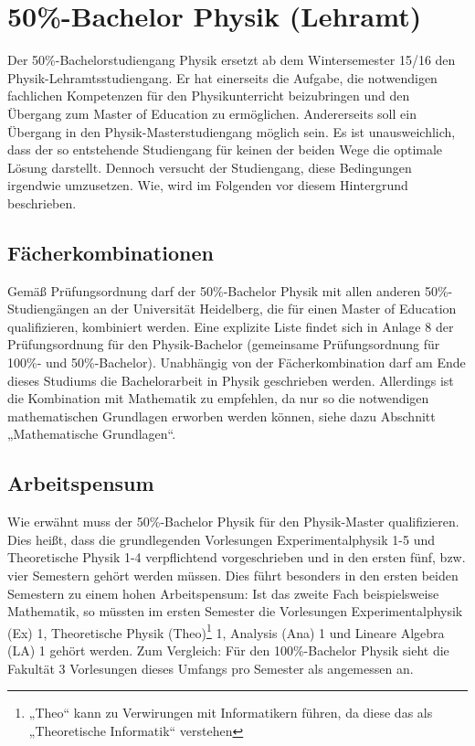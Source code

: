 \section{50\%-Bachelor Physik (Lehramt)} %

Der 50\%-Bachelorstudiengang Physik ersetzt ab dem Wintersemester 15/16 den Physik-Lehramtsstudiengang. Er hat einerseits die Aufgabe, die notwendigen fachlichen Kompetenzen für den Physikunterricht beizubringen und den Übergang zum Master of Education zu ermöglichen. Andererseits soll ein Übergang in den Physik-Masterstudiengang möglich sein. Es ist unausweichlich, dass der so entstehende Studiengang für keinen der beiden Wege die optimale Lösung darstellt. Dennoch versucht der Studiengang, diese Bedingungen irgendwie umzusetzen. Wie, wird im Folgenden vor diesem Hintergrund beschrieben.

\subsection{Fächerkombinationen}

Gemäß Prüfungsordnung darf der 50\%-Bachelor Physik mit allen anderen 50\%-Studiengängen an der Universität Heidelberg, die für einen Master of Education qualifizieren, kombiniert werden. Eine explizite Liste findet sich in Anlage 8 der Prüfungsordnung für den Physik-Bachelor (gemeinsame Prüfungsordnung für 100\%- und 50\%-Bachelor). Unabhängig von der Fächerkombination darf am Ende dieses Studiums die Bachelorarbeit in Physik geschrieben werden. Allerdings ist die Kombination mit Mathematik zu empfehlen, da nur so die notwendigen mathematischen Grundlagen erworben werden können, siehe dazu Abschnitt „Mathematische Grundlagen“.

\subsection{Arbeitspensum}

Wie erwähnt muss der 50\%-Bachelor Physik für den Physik-Master qualifizieren. Dies heißt, dass die grundlegenden Vorlesungen Experimentalphysik 1-5 und Theoretische Physik 1-4 verpflichtend vorgeschrieben und in den ersten fünf, bzw. vier Semestern gehört werden müssen. Dies führt besonders in den ersten beiden Semestern zu einem hohen Arbeitspensum: Ist das zweite Fach beispielsweise Mathematik, so müssten im ersten Semester die Vorlesungen Experimentalphysik (Ex) 1, Theoretische Physik (Theo)\footnote{„Theo“ kann zu Verwirungen mit Informatikern führen, da diese das als „Theoretische Informatik“ verstehen} 1, Analysis (Ana) 1 und Lineare Algebra (LA) 1 gehört werden. Zum Vergleich: Für den 100\%-Bachelor Physik sieht die Fakultät 3 Vorlesungen dieses Umfangs pro Semester als angemessen an.

